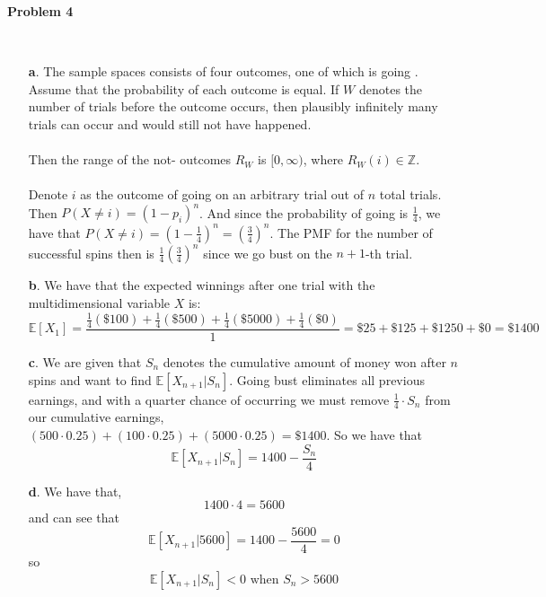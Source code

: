 \textbf{Problem 4}

 
\begin{solution}\ 
\begin{itemize}
 \item[\textbf{a}.] The sample spaces consists of four outcomes, one of which is going . Assume that the probability of each outcome is equal. If $W$ denotes the number of trials before the  outcome occurs, then  plausibly infinitely many trials can occur and  would still not have happened.\\\\
 Then the range of the not- outcomes $R_W$ is $[0, \infty) $, where $R_W(i) \in \mathbb{Z}$.\\\\
 Denote $i$ as the outcome of going  on an arbitrary trial out of $n$ total trials. Then $P(X \neq i) = (1 - p_i)^n$. And since the probability of going \textquote{bust} is $\frac{1}{4}$, we have that $P(X \neq i) = (1 - \frac{1}{4})^n = (\frac{3}{4})^n$. The PMF for the number of successful spins then is $\frac{1}{4}(\frac{3}{4})^n$ since we go bust on the $n+1$-th trial.
 \item[\textbf{b}.] We have that the expected winnings after one trial with the multidimensional variable $X$ is:\[\mathbb{E}[X_1] =\frac{\frac{1}{4}(\text{\$100})+\frac{1}{4}(\text{\$500})+\frac{1}{4}(\text{\$5000})+\frac{1}{4}(\text{\$0})}{1} = \text{\$25} + \text{\$125} + \text{\$1250} + \text{\$0} = \text{\$1400}\]
 \item[\textbf{c}.] We are given that $S_n$ denotes the cumulative amount of money won after $n$ spins and want to find $\mathbb{E}[X_{n+1} | S_n]$. Going bust eliminates all previous earnings, and with a quarter chance of occurring we must remove $\frac{1}{4}\cdot S_n$ from our cumulative earnings, $(500 \cdot 0.25) + (100 \cdot 0.25) + (5000 \cdot 0.25) = \$1400$. So we have that \[\mathbb{E}[X_{n+1}|S_n] = 1400 - \frac{S_n}{4}\]
\item[\textbf{d}.] We have that,
\[1400 \cdot 4 = 5600\]
and can see that 
\[\mathbb{E}[X_{n+1}|5600] = 1400 - \frac{5600}{4} = 0\]
so
\[\mathbb{E}[X_{n+1}|S_n] < 0 \text{ when } S_n > 5600\]

\end{itemize}
\end{solution}